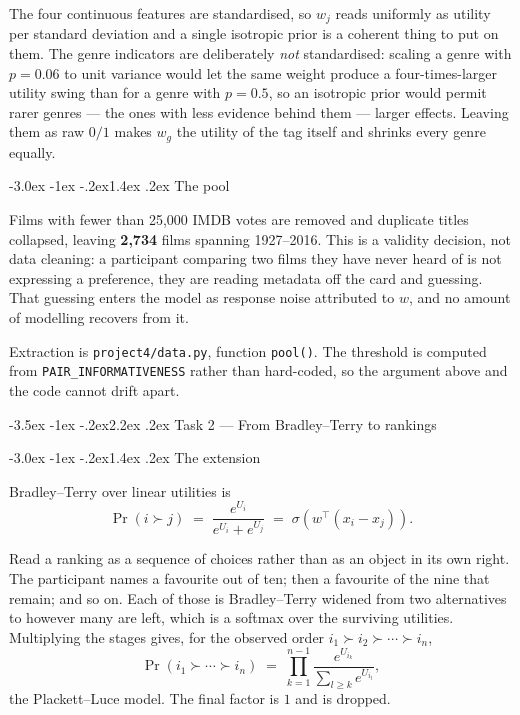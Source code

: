 \documentclass[11pt,a4paper]{article}
\makeatletter
\renewcommand\section{\@startsection{section}{1}{\z@}%
  {-3.5ex \@plus -1ex \@minus -.2ex}{2.2ex \@plus.2ex}%
  {\normalfont\Large\sffamily\bfseries\color{accent}}}
\renewcommand\subsection{\@startsection{subsection}{2}{\z@}%
  {-3.0ex \@plus -1ex \@minus -.2ex}{1.4ex \@plus .2ex}%
  {\normalfont\large\sffamily\bfseries\color{accent}}}
\newcommand{\file}[1]{\texttt{\small #1}}
\makeatother
\begin{document}
The four continuous features are standardised, so $w_j$ reads uniformly as
utility per standard deviation and a single isotropic prior is a coherent thing
to put on them. The genre indicators are deliberately \emph{not} standardised:
scaling a genre with $p = 0.06$ to unit variance would let the same weight
produce a four-times-larger utility swing than for a genre with $p = 0.5$, so an
isotropic prior would permit rarer genres --- the ones with less evidence behind
them --- larger effects. Leaving them as raw $0/1$ makes $w_g$ the utility of the
tag itself and shrinks every genre equally.

\subsection{The pool}

Films with fewer than 25{,}000 IMDB votes are removed and duplicate titles
collapsed, leaving \textbf{2{,}734} films spanning 1927--2016. This is a validity
decision, not data cleaning: a participant comparing two films they have never
heard of is not expressing a preference, they are reading metadata off the card
and guessing. That guessing enters the model as response noise attributed to
$w$, and no amount of modelling recovers from it.

Extraction is \file{project4/data.py}, function \file{pool()}. The threshold is
computed from \file{PAIR\_INFORMATIVENESS} rather than hard-coded, so the
argument above and the code cannot drift apart.

\section{Task 2 --- From Bradley--Terry to rankings}

\subsection{The extension}

Bradley--Terry over linear utilities is
\[
  \Pr(i \succ j) \;=\; \frac{e^{U_i}}{e^{U_i} + e^{U_j}}
                 \;=\; \sigma\!\left(w^{\!\top}(x_i - x_j)\right).
\]

Read a ranking as a sequence of choices rather than as an object in its own
right. The participant names a favourite out of ten; then a favourite of the nine
that remain; and so on. Each of those is Bradley--Terry widened from two
alternatives to however many are left, which is a softmax over the surviving
utilities. Multiplying the stages gives, for the observed order
$i_1 \succ i_2 \succ \cdots \succ i_n$,
\begin{equation}
  \Pr(i_1 \succ \cdots \succ i_n)
  \;=\; \prod_{k=1}^{n-1} \frac{e^{U_{i_k}}}{\sum_{l \geq k} e^{U_{i_l}}} ,
  \label{eq:pl}
\end{equation}
the Plackett--Luce model. The final factor is $1$ and is dropped.
\end{document}
